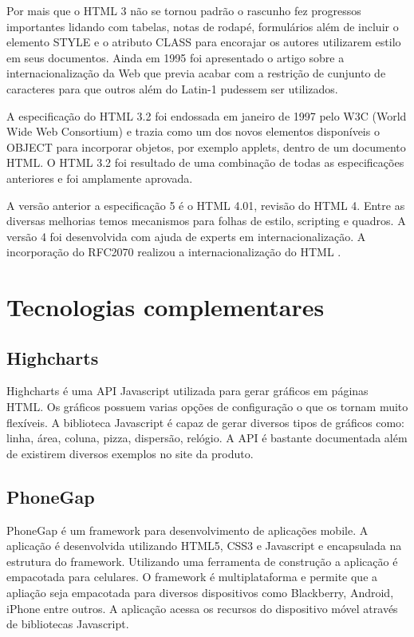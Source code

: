 Por mais que o HTML 3 não se tornou padrão o rascunho fez progressos importantes lidando com tabelas, notas de rodapé, formulários além de incluir o elemento STYLE e o atributo CLASS para encorajar os autores utilizarem estilo em seus documentos. Ainda em 1995 foi apresentado o artigo sobre a internacionalização da Web que previa acabar com a restrição de cunjunto de caracteres para que outros além do Latin-1 pudessem ser utilizados.

A especificação do HTML 3.2 foi endossada em janeiro de 1997 pelo W3C (World Wide Web Consortium) e trazia como um dos novos elementos disponíveis o OBJECT para incorporar objetos, por exemplo applets, dentro de um documento HTML. O HTML 3.2 foi resultado de uma combinação de todas as especificações anteriores e foi amplamente aprovada. \cite{htmlHist}

A versão anterior a especificação 5 é o HTML 4.01, revisão do HTML 4. Entre as diversas melhorias temos mecanismos para folhas de estilo, scripting e quadros. A versão 4 foi desenvolvida com ajuda de experts em internacionalização. A incorporação do RFC2070 realizou a internacionalização do HTML \cite{html4Int}.

\chapter{Tecnologias complementares}

\section{Highcharts}
Highcharts é uma API Javascript utilizada para gerar gráficos em páginas HTML. Os gráficos possuem varias opções de configuração o que os tornam muito flexíveis. A biblioteca Javascript é capaz de gerar diversos tipos de gráficos como: linha, área, coluna, pizza, dispersão, relógio. A API é bastante documentada além de existirem diversos exemplos no site da produto.

\section{PhoneGap}
PhoneGap é um framework para desenvolvimento de aplicações mobile. A aplicação é desenvolvida utilizando HTML5, CSS3 e Javascript e encapsulada na estrutura do framework. Utilizando uma ferramenta de construção a aplicação é empacotada para celulares. O framework é multiplataforma e permite que a apliação seja empacotada para diversos dispositivos como Blackberry, Android, iPhone entre outros. A aplicação acessa os recursos do dispositivo móvel através de bibliotecas Javascript.

